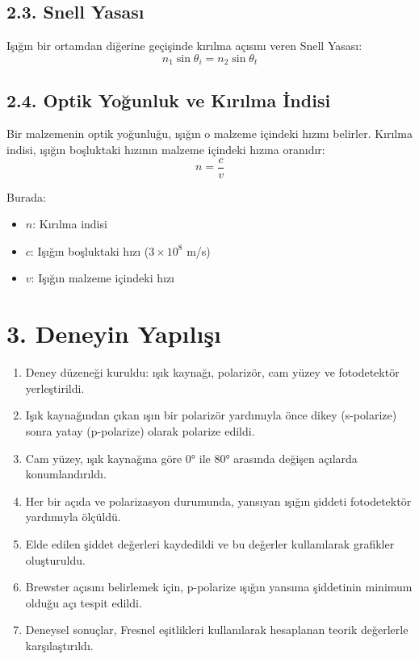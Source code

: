 \documentclass[11pt,letterpaper,twocolumn]{fenbil}
\begin{document}
\subsection*{2.3. Snell Yasası}
Işığın bir ortamdan diğerine geçişinde kırılma açısını veren Snell Yasası:
\[
n_1 \sin{\theta_i} = n_2 \sin{\theta_t}
\]

\subsection*{2.4. Optik Yoğunluk ve Kırılma İndisi}
Bir malzemenin optik yoğunluğu, ışığın o malzeme içindeki hızını belirler. Kırılma indisi, ışığın boşluktaki hızının malzeme içindeki hızına oranıdır:
\[
n = \frac{c}{v}
\]

Burada:
\begin{itemize}
    \item \( n \): Kırılma indisi
    \item \( c \): Işığın boşluktaki hızı (\( 3 \times 10^8 \) m/s)
    \item \( v \): Işığın malzeme içindeki hızı
\end{itemize}

\section*{3. Deneyin Yapılışı}
\begin{enumerate}
    \item Deney düzeneği kuruldu: ışık kaynağı, polarizör, cam yüzey ve fotodetektör yerleştirildi.
    \item Işık kaynağından çıkan ışın bir polarizör yardımıyla önce dikey (s-polarize) sonra yatay (p-polarize) olarak polarize edildi.
    \item Cam yüzey, ışık kaynağına göre 0° ile 80° arasında değişen açılarda konumlandırıldı.
    \item Her bir açıda ve polarizasyon durumunda, yansıyan ışığın şiddeti fotodetektör yardımıyla ölçüldü.
    \item Elde edilen şiddet değerleri kaydedildi ve bu değerler kullanılarak grafikler oluşturuldu.
    \item Brewster açısını belirlemek için, p-polarize ışığın yansıma şiddetinin minimum olduğu açı tespit edildi.
    \item Deneysel sonuçlar, Fresnel eşitlikleri kullanılarak hesaplanan teorik değerlerle karşılaştırıldı.
\end{enumerate}
\end{document}
